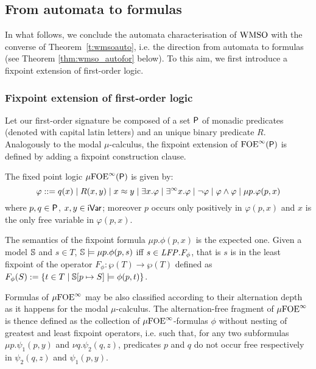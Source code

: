 \subsection{From automata to formulas}\label{sec:aut_to_form_wmso}


In what follows, we conclude the automata characterisation of $\mathrm{WMSO}$ with the converse of Theorem~\ref{t:wmsoauto}, i.e. the direction from automata to formulas (see Theorem \ref{thm:wmso_autofor} below). To this aim, we first introduce a fixpoint extension of first-order logic.

\subsubsection{Fixpoint extension of first-order logic}

Let our first-order signature be composed of a set $\mathsf{P}$ of monadic predicates (denoted with capital latin letters) and an unique binary predicate $R$. Analogously to the modal $\mu$-calculus, the fixpoint extension of ${\mathrm{FOE}}^\infty(\mathsf{P})$ is defined by adding a fixpoint construction clause.

\begin{definition}
The fixed point logic $\mu{\ensuremath{\mathrm{FOE}}}^\infty(\mathsf{P})$ is given by:
$$
\varphi ::= q(x) \mid R(x,y) \mid x \approx y \mid \exists x.\varphi \mid \exists^\infty x.\varphi \mid \lnot\varphi \mid \varphi \land \varphi \mid \mu p.\varphi(p,x)
$$
where $p,q\in\mathsf{P}$, $x,y\in\mathsf{iVar}$; moreover $p$ occurs only positively in $\varphi(p,x)$ and $x$ is the only free variable in $\varphi(p,x)$.
\end{definition}

The semantics of the fixpoint formula $\mu p. \phi(p, x)$ is the expected one. Given a model $\mathbb{S}$ and $s \in T$,  $\mathbb{S} \models \mu p. \phi(p, s)$ iff $s \in \mathit{LFP}. F_\phi$, that is $s$ is in the least fixpoint of the  operator $F_\phi:\wp(T)\to \wp(T)$ defined as $F_\phi(S) := \{t \in T \mid \mathbb{S}[p \mapsto S] \models \phi(p, t) \}$.

Formulas of $\mu{\ensuremath{\mathrm{FOE}}}^\infty$ may be also classified according to their alternation depth as it happens for the modal $\mu$-calculus.
The alternation-free fragment of $\mu{\ensuremath{\mathrm{FOE}}}^\infty$ is thence defined as the collection of $\mu{\ensuremath{\mathrm{FOE}}}^\infty$-formulas $\phi$
without nesting of greatest and least fixpoint operators, i.e. such that, for any two subformulas $\mu p.\psi_1(p,y)$ and $\nu q. \psi_2(q,z)$, predicates $p$ and $q$ do not occur free respectively in $\psi_2(q,z)$ and $\psi_1(p,y)$.

